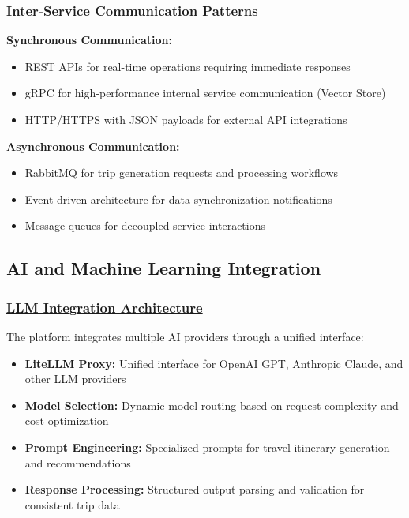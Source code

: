 \subsubsection*{\underline{Inter-Service Communication Patterns}}

\textbf{Synchronous Communication:}
\begin{itemize}
    \item REST APIs for real-time operations requiring immediate responses
    \item gRPC for high-performance internal service communication (Vector Store)
    \item HTTP/HTTPS with JSON payloads for external API integrations
\end{itemize}

\textbf{Asynchronous Communication:}
\begin{itemize}
    \item RabbitMQ for trip generation requests and processing workflows
    \item Event-driven architecture for data synchronization notifications
    \item Message queues for decoupled service interactions
\end{itemize}

\subsection{AI and Machine Learning Integration}

\subsubsection*{\underline{LLM Integration Architecture}}
The platform integrates multiple AI providers through a unified interface:

\begin{itemize}
    \item \textbf{LiteLLM Proxy:} Unified interface for OpenAI GPT, Anthropic Claude, and other LLM providers
    \item \textbf{Model Selection:} Dynamic model routing based on request complexity and cost optimization
    \item \textbf{Prompt Engineering:} Specialized prompts for travel itinerary generation and recommendations
    \item \textbf{Response Processing:} Structured output parsing and validation for consistent trip data
\end{itemize}

